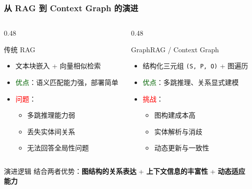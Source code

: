 \documentclass[aspectratio=169,10pt]{beamer}
\begin{document}
\begin{frame}
  \frametitle{从 RAG 到 Context Graph 的演进}

  \begin{columns}[T]
    \begin{column}{0.48\textwidth}
      \begin{block}{传统 RAG}
        \begin{itemize}
          \item 文本块嵌入 + 向量相似检索
          \item \textcolor{darkgreen}{优点}：语义匹配能力强，部署简单
          \item \textcolor{red}{问题}：
          \begin{itemize}
            \item 多跳推理能力弱
            \item 丢失实体间关系
            \item 无法回答全局性问题
          \end{itemize}
        \end{itemize}
      \end{block}
    \end{column}

    \begin{column}{0.48\textwidth}
      \begin{block}{GraphRAG / Context Graph}
        \begin{itemize}
          \item 结构化三元组 \texttt{(S, P, O)} + 图遍历
          \item \textcolor{darkgreen}{优点}：多跳推理、关系显式建模
          \item \textcolor{red}{挑战}：
          \begin{itemize}
            \item 图构建成本高
            \item 实体解析与消歧
            \item 动态更新与一致性
          \end{itemize}
        \end{itemize}
      \end{block}
    \end{column}
  \end{columns}

  \vspace{0.5cm}

  \begin{block}{演进逻辑}
    结合两者优势：\textbf{图结构的关系表达} + \textbf{上下文信息的丰富性} + \textbf{动态适应能力}
  \end{block}
\end{frame}
\end{document}
